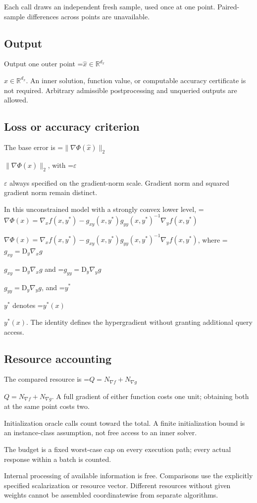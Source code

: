 \documentclass[10pt,a4paper]{article}
\newcommand{\AtlasMath}[1]{\par\begingroup\centering\setbox0=\hbox{$\displaystyle #1$}\ifdim\wd0>1.4\linewidth\typeout{ATLAS WIDE FORMULA: \the\wd0}\fi\ifdim\wd0>\linewidth\resizebox{\linewidth}{!}{\box0}\else\box0\fi\par\endgroup}
\newcommand{\AtlasInlineMath}[1]{\begingroup\setbox0=\hbox{$#1$}\ifdim\wd0>.4\linewidth\endgroup\AtlasMath{#1}\else\endgroup$#1$\fi}
\begin{document}
Each call draws an independent fresh sample, used once at one point. Paired-sample differences across points are unavailable.

\subsection{Output}
Output one outer point \AtlasInlineMath{\widehat{x}\in\mathbb{R}^{d_x}}. An inner solution, function value, or computable accuracy certificate is not required. Arbitrary admissible postprocessing and unqueried outputs are allowed.

\subsection{Loss or accuracy criterion}
The base error is \AtlasInlineMath{\|\nabla\Phi(\widehat{x})\|_2}, with \AtlasInlineMath{\varepsilon} always specified on the gradient-norm scale. Gradient norm and squared gradient norm remain distinct.

In this unconstrained model with a strongly convex lower level, \AtlasInlineMath{\nabla\Phi(x)=\nabla_x f(x,y^*)-g_{xy}(x,y^*)g_{yy}(x,y^*)^{-1}\nabla_y f(x,y^*)}, where \AtlasInlineMath{g_{xy}=\mathrm{D}_y\nabla_x g} and \AtlasInlineMath{g_{yy}=\mathrm{D}_y\nabla_y g}, and \AtlasInlineMath{y^*} denotes \AtlasInlineMath{y^*(x)}. The identity defines the hypergradient without granting additional query access.

\subsection{Resource accounting}
The compared resource is \AtlasInlineMath{Q=N_{\nabla f}+N_{\nabla g}}. A full gradient of either function costs one unit; obtaining both at the same point costs two.

Initialization oracle calls count toward the total. A finite initialization bound is an instance-class assumption, not free access to an inner solver.

The budget is a fixed worst-case cap on every execution path; every actual response within a batch is counted.

Internal processing of available information is free. Comparisons use the explicitly specified scalarization or resource vector. Different resources without given weights cannot be assembled coordinatewise from separate algorithms.
\end{document}
